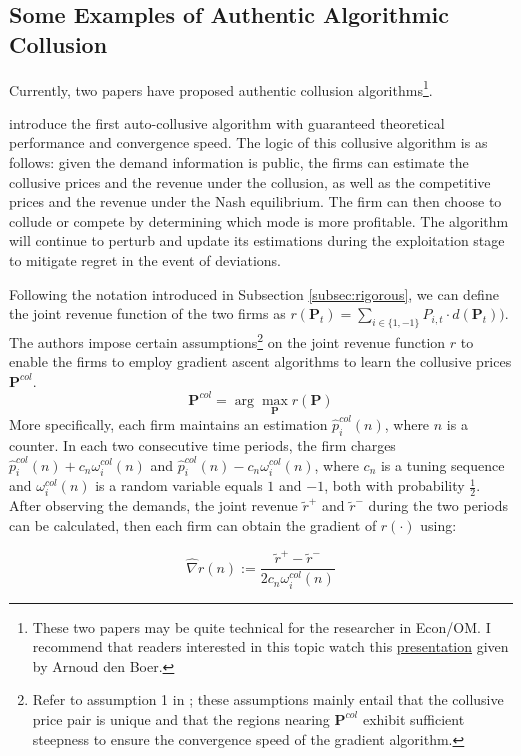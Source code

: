 \documentclass[mnsc,nonblindrev]{workingpaper}
\begin{document}
\subsection{Some Examples of Authentic Algorithmic Collusion}

Currently, two papers have proposed authentic collusion algorithms\footnote{These two papers may be quite technical for the researcher in Econ/OM. I recommend that readers interested in this topic watch this \href{https://www.youtube.com/watch?v=QmazguF7myY}{presentation} given by Arnoud den Boer.}.

\cite{meylahn2022learning} introduce the first auto-collusive algorithm with guaranteed theoretical performance and convergence speed. The logic of this collusive algorithm is as follows: given the demand information is public, the firms can estimate the collusive prices and the revenue under the collusion, as well as the competitive prices and the revenue under the Nash equilibrium. The firm can then choose to collude or compete by determining which mode is more profitable. The algorithm will continue to perturb and update its estimations during the exploitation stage to mitigate regret in the event of deviations.

Following the notation introduced in Subsection \ref{subsec:rigorous}, we can define the joint revenue function of the two firms as $r(\mathbf{P}_{t})=\sum_{i\in \{1,-1\}} P_{i,t}\cdot d(\mathbf{P}_{t}))$. The authors impose certain assumptions\footnote{Refer to assumption 1 in \cite{meylahn2022learning}; these assumptions mainly entail that the collusive price pair is unique and that the regions nearing $\mathbf{P}^{col}$ exhibit sufficient steepness to ensure the convergence speed of the gradient algorithm.} on the joint revenue function $r$ to enable the firms to employ gradient ascent algorithms to learn the collusive prices $\mathbf{P}^{col}$.
\[  
    \mathbf{P}^{col} = \arg\max_{\mathbf{P}} r (\mathbf{P})
\]
More specifically, each firm maintains an estimation $\hat{p}_i^{col}(n)$, where $n$ is a counter. In each two consecutive time periods, the firm charges $\hat{p}_i^{col}(n)+c_n \omega_i^{col}(n)$ and $\hat{p}_i^{col}(n)-c_n \omega_i^{col}(n)$, where $c_n$ is a tuning sequence and $\omega_i^{col}(n)$ is a random variable equals $1$ and $-1$, both with probability $\frac{1}{2}$. After observing the demands, the joint revenue $\tilde{r}^+$ and $\tilde{r}^-$ during the two periods can be calculated, then each firm can obtain the gradient of $r(\cdot)$ using:

\begin{equation}
\label{eq:gradient}
    \hat{\nabla}r(n):=\frac{\tilde{r}^+ - \tilde{r}^-}{2c_{n}\omega_{i}^{col}(n)}
\end{equation}
\end{document}
